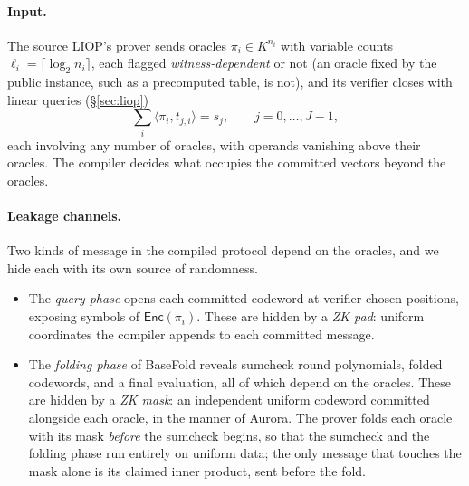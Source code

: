 \documentclass{article}
\theoremstyle{definition}
\begin{document}
\paragraph{Input.}
The source LIOP's prover sends oracles $\pi_i \in K^{n_i}$ with variable counts $\ell_i = \lceil \log_2 n_i \rceil$, each flagged \emph{witness-dependent} or not (an oracle fixed by the public instance, such as a precomputed table, is not), and its verifier closes with linear queries (\S\ref{sec:liop})
\[
  \sum_i \langle \pi_i, t_{j, i} \rangle = s_j, \qquad j = 0, \ldots, J - 1,
\]
each involving any number of oracles, with operands vanishing above their oracles. The compiler decides what occupies the committed vectors beyond the oracles.

\paragraph{Leakage channels.}
Two kinds of message in the compiled protocol depend on the oracles, and we hide each with its own source of randomness.
\begin{itemize}
\item The \emph{query phase} opens each committed codeword at verifier-chosen positions, exposing symbols of $\textsf{Enc}(\pi_i)$. These are hidden by a \emph{ZK pad}: uniform coordinates the compiler appends to each committed message.
\item The \emph{folding phase} of BaseFold reveals sumcheck round polynomials, folded codewords, and a final evaluation, all of which depend on the oracles. These are hidden by a \emph{ZK mask}: an independent uniform codeword committed alongside each oracle, in the manner of Aurora. The prover folds each oracle with its mask \emph{before} the sumcheck begins, so that the sumcheck and the folding phase run entirely on uniform data; the only message that touches the mask alone is its claimed inner product, sent before the fold.
\end{itemize}
\end{document}

